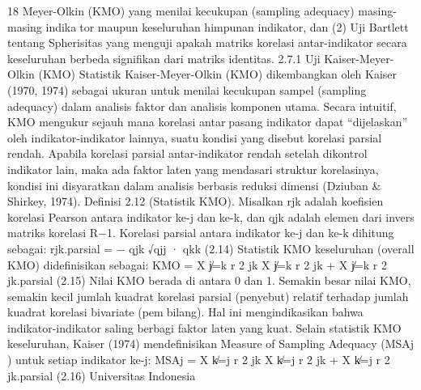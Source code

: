 18
Meyer-Olkin (KMO) yang menilai kecukupan (sampling adequacy) masing-masing indikator maupun keseluruhan himpunan indikator, dan (2) Uji Bartlett tentang Spherisitas yang
menguji apakah matriks korelasi antar-indikator secara keseluruhan berbeda signifikan
dari matriks identitas.
2.7.1 Uji Kaiser-Meyer-Olkin (KMO)
Statistik Kaiser-Meyer-Olkin (KMO) dikembangkan oleh Kaiser (1970, 1974) sebagai
ukuran untuk menilai kecukupan sampel (sampling adequacy) dalam analisis faktor dan
analisis komponen utama. Secara intuitif, KMO mengukur sejauh mana korelasi antarpasang indikator dapat “dijelaskan” oleh indikator-indikator lainnya, suatu kondisi yang
disebut korelasi parsial rendah. Apabila korelasi parsial antar-indikator rendah setelah
dikontrol indikator lain, maka ada faktor laten yang mendasari struktur korelasinya, kondisi
ini disyaratkan dalam analisis berbasis reduksi dimensi (Dziuban & Shirkey, 1974).
Definisi 2.12 (Statistik KMO). Misalkan rjk adalah koefisien korelasi Pearson antara
indikator ke-j dan ke-k, dan qjk adalah elemen dari invers matriks korelasi R−1. Korelasi
parsial antara indikator ke-j dan ke-k dihitung sebagai:
rjk.parsial = −
qjk
√qjj · qkk
(2.14)
Statistik KMO keseluruhan (overall KMO) didefinisikan sebagai:
KMO =
X
j̸=k
r
2
jk
X
j̸=k
r
2
jk +
X
j̸=k
r
2
jk.parsial
(2.15)
Nilai KMO berada di antara 0 dan 1. Semakin besar nilai KMO, semakin kecil jumlah
kuadrat korelasi parsial (penyebut) relatif terhadap jumlah kuadrat korelasi bivariate (pembilang). Hal ini mengindikasikan bahwa indikator-indikator saling berbagi faktor laten
yang kuat.
Selain statistik KMO keseluruhan, Kaiser (1974) mendefinisikan Measure of Sampling
Adequacy (MSAj ) untuk setiap indikator ke-j:
MSAj =
X
k̸=j
r
2
jk
X
k̸=j
r
2
jk +
X
k̸=j
r
2
jk.parsial
(2.16)
Universitas Indonesia

